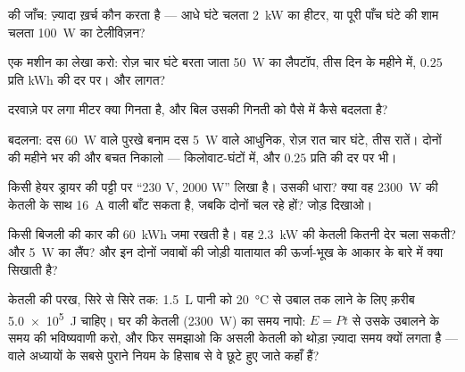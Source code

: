 \begin{exercise}[$\star$]\label{exo:g9:electric-power-energy:6}
 की जाँच: ज़्यादा ख़र्च कौन करता है --- आधे घंटे चलता \qty{2}{kW}
का हीटर, या पूरी पाँच घंटे की शाम चलता \qty{100}{W} का टेलीविज़न?
\end{exercise}

\begin{exercise}[$\star$]\label{exo:g9:electric-power-energy:7}
एक मशीन का लेखा करो: रोज़ चार घंटे बरता जाता \qty{50}{W} का लैपटॉप,
तीस दिन के महीने में, $0.25$ प्रति \unit{kWh} की दर पर।  और
लागत?
\end{exercise}

\begin{exercise}[$\star$]\label{exo:g9:electric-power-energy:8}
दरवाज़े पर लगा मीटर क्या गिनता है, और बिल उसकी गिनती को पैसे में कैसे
बदलता है?
\end{exercise}

\begin{exercise}[$\star\star$]\label{exo:g9:electric-power-energy:9}
 बदलना: दस \qty{60}{W} वाले पुरखे बनाम दस \qty{5}{W} वाले आधुनिक,
रोज़ रात चार घंटे, तीस रातें। दोनों की महीने भर की  और बचत निकालो
--- किलोवाट-घंटों में, और $0.25$ प्रति  की दर पर भी।
\end{exercise}

\begin{exercise}[$\star\star$]\label{exo:g9:electric-power-energy:10}
किसी हेयर ड्रायर की पट्टी पर ``230 V, 2000 W'' लिखा है। उसकी धारा?
क्या वह \qty{2300}{W} की केतली के साथ \qty{16}{A} वाली  बाँट सकता
है, जबकि दोनों चल रहे हों? जोड़ दिखाओ।
\end{exercise}

\begin{exercise}[$\star\star$]\label{exo:g9:electric-power-energy:11}
किसी बिजली की कार की  \qty{60}{kWh} जमा रखती है। वह 
\qty{2.3}{kW} की केतली कितनी देर चला सकती? और \qty{5}{W} का लैंप? और
इन दोनों जवाबों की जोड़ी यातायात की ऊर्जा-भूख के आकार के बारे में क्या
सिखाती है?
\end{exercise}

\begin{exercise}[$\star\star\star$]\label{exo:g9:electric-power-energy:12}
केतली की परख, सिरे से सिरे तक: \qty{1.5}{L} पानी को
\qty{20}{\celsius} से उबाल तक लाने के लिए क़रीब \qty{5.0e5}{J} 
चाहिए। घर की केतली (\qty{2300}{W}) का समय नापो: $E = P t$ से उसके
उबालने के समय की भविष्यवाणी करो, और फिर समझाओ कि असली केतली को थोड़ा
ज़्यादा समय क्यों लगता है ---  वाले अध्यायों के सबसे पुराने नियम
के हिसाब से वे छूटे हुए  जाते कहाँ हैं?
\end{exercise}

